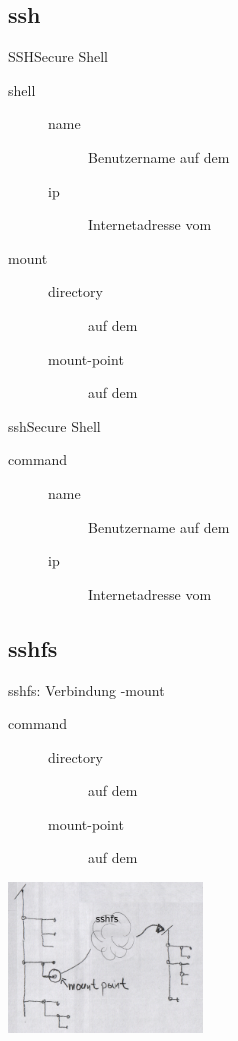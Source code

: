 \subsection{ssh}
\begin{frame}{SSH}{Secure Shell}
 \begin{description}
  \item[shell]  
  \begin{description}
   \item[name] Benutzername auf dem \target
   \item[ip] Internetadresse vom \target 
  \end{description}
  \item[mount] 
  \begin{description}
   \item[directory] auf dem \target
   \item[mount-point] auf dem \host
  \end{description}
 \end{description}
\end{frame}

\begin{frame}{ssh}{Secure Shell}
 \begin{description}
  \item[command]  
  \begin{description}
   \item[name] Benutzername auf dem \target
   \item[ip] Internetadresse vom \target 
  \end{description}
 \end{description}
\end{frame}

\subsection{sshfs}
\begin{frame}{sshfs: Verbindung \target-\host}{mount}
 \begin{description}
  \item[command] 
  \begin{description}
   \item[directory] auf dem \target
   \item[mount-point] auf dem \host
  \end{description}
 \end{description}
 \begin{center}
  \includegraphics[height=4cm]{sshfs.png}
 \end{center}
\end{frame}

